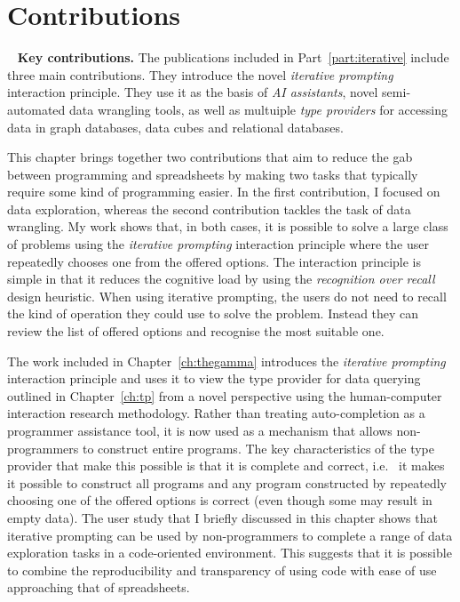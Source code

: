 \documentclass[fleqn,11pt]{report}
\theoremstyle{definition}
\DeclareRobustCommand{\keyideabox}[3]{\begin{tcolorbox}[breakable,
  boxsep=10pt,left=0pt,right=0pt,top=0pt,bottom=0pt,width=\dimexpr\textwidth\relax,
  colback=gray!20,colframe=gray!20,
  enlarge bottom by=5pt,enlarge top by=5pt,
  arc=0pt,outer arc=0pt]
\lettrine[lraise=0.3]{\LARGE #1}{~}
\textbf{#2.} #3
\end{tcolorbox}
}
\begin{document}
\section{Contributions}

\keyideabox{\faPencilSquareO}{Key contributions}{The publications included in Part~\ref{part:iterative}
include three main contributions. They introduce the novel \emph{iterative prompting} interaction
principle. They use it as the basis of \emph{AI assistants}, novel semi-automated data wrangling
tools, as well as multuiple \emph{type providers} for accessing data in graph databases,
data cubes and relational databases.}

\noindent
This chapter brings together two contributions that aim to reduce the gab between programming
and spreadsheets by making two tasks that typically require some kind of programming easier.
In the first contribution, I focused on data exploration, whereas the second contribution tackles
the task of data wrangling. My work shows that, in both cases, it is possible to solve
a large class of problems using the \emph{iterative prompting} interaction principle where the
user repeatedly chooses one from the offered options. The interaction principle is simple in
that it reduces the cognitive load by using the \emph{recognition over recall} design heuristic.
When using iterative prompting, the users do not need to recall the kind of operation they
could use to solve the problem. Instead they can review the list of offered options and recognise
the most suitable one.

The work included in Chapter~\ref{ch:thegamma} introduces the \emph{iterative prompting}
interaction principle and uses it to view the type provider for data querying outlined in
Chapter~\ref{ch:tp} from a novel perspective using the human-computer interaction research
methodology. Rather than treating auto-completion as a programmer assistance tool, it is
now used as a mechanism that allows non-programmers to construct entire programs. The key
characteristics of the type provider that make this possible is that it is complete and correct,
i.e.~ it makes it possible to construct all programs and any program constructed by
repeatedly choosing one of the offered options is correct (even though some may result in
empty data). The user study that I briefly discussed in this chapter shows that iterative
prompting can be used by non-programmers to complete a range of data exploration tasks
in a code-oriented environment. This suggests that it is possible to combine the reproducibility
and transparency of using code with ease of use approaching that of spreadsheets.
\end{document}
